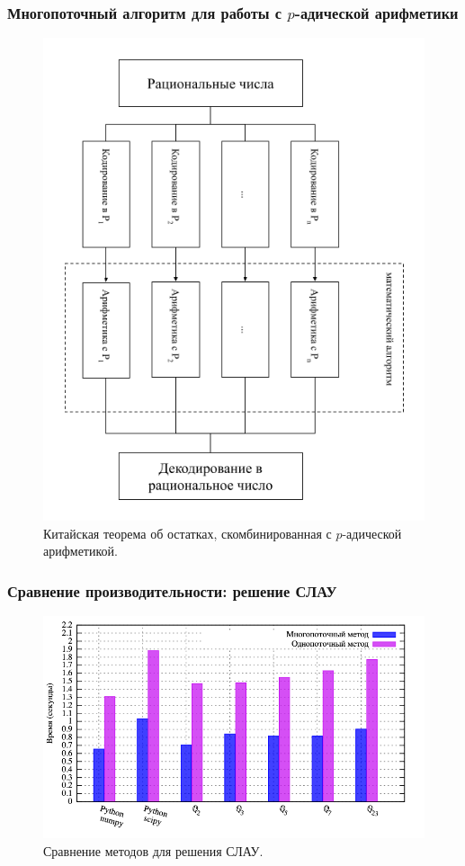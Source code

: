 \documentclass[10pt,professionalfont,utf8,presentation,compress]{beamer}
\theoremstyle{definition}
\theoremstyle{plain}
\begin{document}
\begin{frame}
\frametitle{Многопоточный алгоритм для работы с $p$-адической арифметики}
\begin{figure}[H]
\centerline{\includegraphics[width=0.5\linewidth]{images/multi/schema.png}}
\caption{Китайская теорема об остатках, скомбинированная с $p$-адической арифметикой.}
\label{img:multi:schema}
\end{figure}
\end{frame}


\begin{frame}
\frametitle{Сравнение производительности: решение СЛАУ}
\begin{figure}[H]
\centerline{\includegraphics[width=0.95\linewidth]{../gnuplot/multi/gauss/plot.png}}
\caption{Сравнение методов для решения СЛАУ.}
\label{img:multi:gauss}
\end{figure}
\end{frame}
\end{document}
